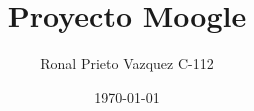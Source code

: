 \documentclass[10pt]{beamer}
\title[Moogle]{Proyecto Moogle}
\author{Ronal Prieto Vazquez   C-112}
\institute[UH]{Facultad de Matematica y Computacion \\Universidad de La Habana}
\date{\today}
\begin{document}
\frame{\titlepage}






    
\end{document}
